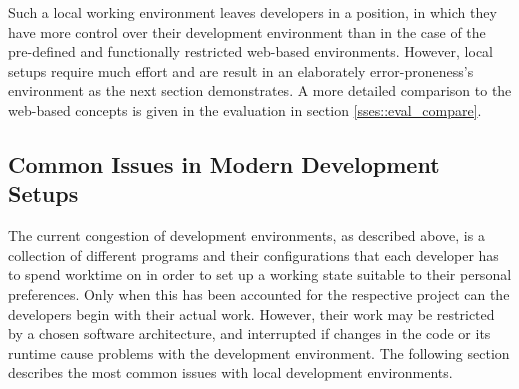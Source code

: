     Such a local working environment leaves developers in a position, in which they have more control over their development environment than in the case of the pre-defined and functionally restricted web-based environments.
    However, local setups require much effort and are result in an elaborately error-proneness's environment as the next section demonstrates. A more detailed comparison to the web-based concepts is given in the evaluation in section \ref{sses::eval_compare}.

    \subsection{Common Issues in Modern Development Setups}
    The current congestion of development environments, as described above, is a collection of different programs and their configurations that each developer has to spend worktime on in order to set up a working state suitable to their personal preferences. Only when this has been accounted for the respective project can the developers begin with their actual work. However, their work may be restricted by a chosen software architecture, and interrupted if changes in the code or its runtime cause problems with the development environment. The following section describes the most common issues with local development environments.

